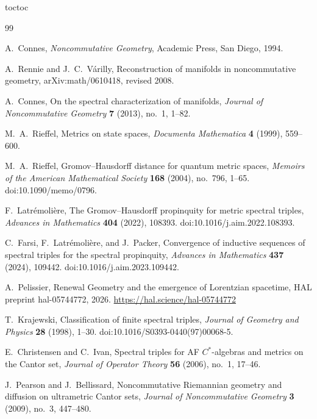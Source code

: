 \documentclass[11pt]{article}
\makeatletter
\newif\ifmathsupplement
\let\RG@addcontentsline\addcontentsline
\renewcommand{\addcontentsline}[3]{%
  \def\RG@tocname{#1}\def\RG@toc{toc}%
  \ifx\RG@tocname\RG@toc
    \RG@addcontentsline{toc}{#2}{#3}%
    \ifmathsupplement
      \RG@addcontentsline{supptoc}{#2}{#3}%
    \else
      \RG@addcontentsline{maintoc}{#2}{#3}%
    \fi
  \else
    \RG@addcontentsline{#1}{#2}{#3}%
  \fi}
\theoremstyle{definition}
\theoremstyle{remark}
\theoremstyle{definition}
\theoremstyle{remark}
\makeatother
\begin{document}
\clearpage
{}
{}
\begin{thebibliography}{99}

A.~Connes,
\newblock \emph{Noncommutative Geometry},
\newblock Academic Press, San Diego, 1994.

A.~Rennie and J.~C.~V\'arilly,
\newblock Reconstruction of manifolds in noncommutative geometry,
\newblock arXiv:math/0610418, revised 2008.

A.~Connes,
\newblock On the spectral characterization of manifolds,
\newblock \emph{Journal of Noncommutative Geometry} \textbf{7} (2013), no.~1,
1--82.

M.~A.~Rieffel,
\newblock Metrics on state spaces,
\newblock \emph{Documenta Mathematica} \textbf{4} (1999), 559--600.

M.~A.~Rieffel,
\newblock Gromov--Hausdorff distance for quantum metric spaces,
\newblock \emph{Memoirs of the American Mathematical Society} \textbf{168}
(2004), no.~796, 1--65.
\newblock doi:10.1090/memo/0796.

F.~Latr\'emoli\`ere,
\newblock The Gromov--Hausdorff propinquity for metric spectral triples,
\newblock \emph{Advances in Mathematics} \textbf{404} (2022), 108393.
\newblock doi:10.1016/j.aim.2022.108393.

C.~Farsi, F.~Latr\'emoli\`ere, and J.~Packer,
\newblock Convergence of inductive sequences of spectral triples for the spectral
propinquity,
\newblock \emph{Advances in Mathematics} \textbf{437} (2024), 109442.
\newblock doi:10.1016/j.aim.2023.109442.

A.~Pelissier,
\newblock Renewal Geometry and the emergence of Lorentzian spacetime,
\newblock HAL preprint hal-05744772, 2026.
\newblock \url{https://hal.science/hal-05744772}

T.~Krajewski,
\newblock Classification of finite spectral triples,
\newblock \emph{Journal of Geometry and Physics} \textbf{28} (1998), 1--30.
\newblock doi:10.1016/S0393-0440(97)00068-5.

E.~Christensen and C.~Ivan,
\newblock Spectral triples for AF $C^*$-algebras and metrics on the Cantor set,
\newblock \emph{Journal of Operator Theory} \textbf{56} (2006), no.~1, 17--46.

J.~Pearson and J.~Bellissard,
\newblock Noncommutative Riemannian geometry and diffusion on ultrametric Cantor sets,
\newblock \emph{Journal of Noncommutative Geometry} \textbf{3} (2009), no.~3,
447--480.


\end{thebibliography}
\end{document}
